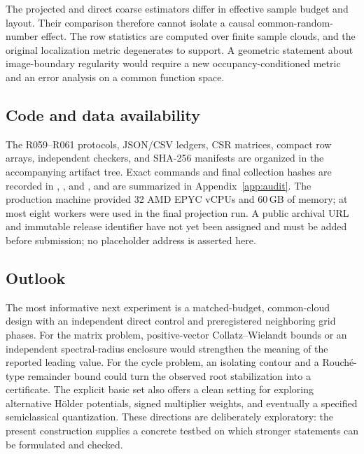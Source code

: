 The projected and direct coarse estimators differ in effective sample budget
and layout.  Their comparison therefore cannot isolate a causal
common-random-number effect.  The row statistics are computed over finite
sample clouds, and the original localization metric degenerates to support.
A geometric statement about image-boundary regularity would require a new
occupancy-conditioned metric and an error analysis on a common function space.

\subsection{Code and data availability}

The R059--R061 protocols, JSON/CSV ledgers, CSR matrices, compact row arrays,
independent checkers, and SHA-256 manifests are organized in the accompanying
artifact tree.  Exact commands and final collection hashes are recorded in
,
, and
, and are summarized in
Appendix~\ref{app:audit}.  The
production machine provided 32 AMD EPYC vCPUs and 60\,GB of memory; at most
eight workers were used in the final projection run.  A public archival URL
and immutable release identifier have not yet been assigned and must be added
before submission; no placeholder address is asserted here.

\subsection{Outlook}

The most informative next experiment is a matched-budget, common-cloud design
with an independent direct control and preregistered neighboring grid phases.
For the matrix problem, positive-vector Collatz--Wielandt bounds or an
independent spectral-radius enclosure would strengthen the meaning of the
reported leading value.  For the cycle problem, an isolating contour and a
Rouch\'e-type remainder bound could turn the observed root stabilization into
a certificate.  The explicit basic set also offers a clean setting for
exploring alternative H\"older potentials, signed multiplier weights, and
eventually a specified semiclassical quantization.  These directions are
deliberately exploratory: the present construction supplies a concrete testbed
on which stronger statements can be formulated and checked.

